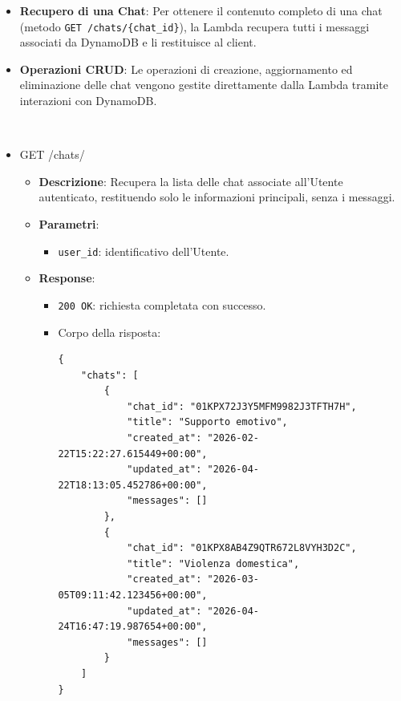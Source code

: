 \documentclass[a4paper,12pt]{article}
\makeatletter
\newcommand\subsubsubsection{\@startsection{paragraph}{4}{\z@}{-2.5ex\@plus -1ex \@minus -.25ex}{1.25ex \@plus .25ex}{\normalfont\normalsize\bfseries}}
\newcommand{\code}[1]{{\ttfamily\textcolor{purple!85!black}{#1}}}
\makeatother
\begin{document}
\begin{itemize}
    \item \textbf{Recupero di una Chat}: Per ottenere il contenuto completo di una chat (metodo \texttt{GET /chats/\{chat\_id\}}), la Lambda recupera tutti i messaggi associati da DynamoDB e li restituisce al client.
    
    \item \textbf{Operazioni CRUD}: Le operazioni di creazione, aggiornamento ed eliminazione delle chat vengono gestite direttamente dalla Lambda tramite interazioni con DynamoDB.
\end{itemize}

\subsubsubsection{API associate}\mbox{}\\
\begin{itemize}
    \item \code{GET /chats/}
        \begin{itemize}
            \item \textbf{Descrizione}: Recupera la lista delle chat associate all’Utente autenticato, restituendo solo le informazioni principali, senza i messaggi.
            
            \item \textbf{Parametri}:
            \begin{itemize}
                \item \texttt{user\_id}: identificativo dell’Utente.
            \end{itemize}
            
            \item \textbf{Response}:
            \begin{itemize}
                \item \texttt{200 OK}: richiesta completata con successo.
                \item Corpo della risposta:
\begin{verbatim}
{
    "chats": [
        {
            "chat_id": "01KPX72J3Y5MFM9982J3TFTH7H",
            "title": "Supporto emotivo",
            "created_at": "2026-02-22T15:22:27.615449+00:00",
            "updated_at": "2026-04-22T18:13:05.452786+00:00",
            "messages": []
        },
        {
            "chat_id": "01KPX8AB4Z9QTR672L8VYH3D2C",
            "title": "Violenza domestica",
            "created_at": "2026-03-05T09:11:42.123456+00:00",
            "updated_at": "2026-04-24T16:47:19.987654+00:00",
            "messages": []      
        }
    ]
}
\end{verbatim}
            \end{itemize}
            

\end{itemize}
\end{itemize}
\end{document}
